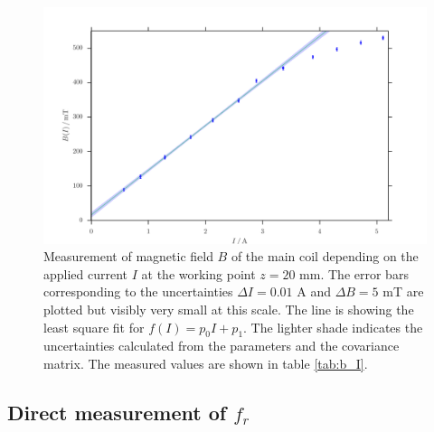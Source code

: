 \begin{figure}[H]
    \includegraphics[width=\textwidth]{figures/b_I.pdf}
    \caption{   
        Measurement of magnetic field $B$ of the main coil depending on the applied current 
        $I$ at the working point $z = 20$ mm. The error bars corresponding 
        to the uncertainties $\Delta I = 0.01$ A 
        and $\Delta B = 5$ mT are plotted but visibly very small at this scale. 
        The line is showing the least square fit for $f(I) = p_0 I + p_1$. The 
        lighter shade indicates the uncertainties calculated from the parameters 
        and the covariance matrix. 
        The measured values are shown in table \ref{tab:b_I}.
        }
    \label{fig:b_I}
\end{figure}


\subsection{Direct measurement of $f_r$}
